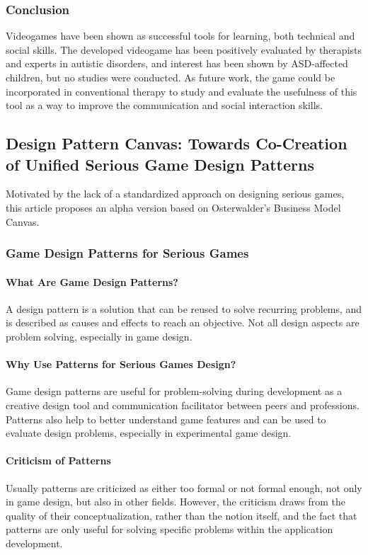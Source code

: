 \documentclass[runningheads]{llncs}
\begin{document}
\subsubsection{Conclusion}
\par Videogames have been shown as successful tools for learning, both technical and social skills. The developed videogame has been positively evaluated by therapists and experts in autistic disorders, and interest has been shown by ASD-affected children, but no studies were conducted. As future work, the game could be incorporated in conventional therapy to study and evaluate the usefulness of this tool as a way to improve the communication and social interaction skills.

\subsection{Design Pattern Canvas: Towards Co-Creation of Unified Serious Game Design Patterns} 
\par Motivated by the lack of a standardized approach on designing serious games, this article proposes an alpha version based on Osterwalder's Business Model Canvas.
\subsubsection{Game Design Patterns for Serious Games}
\paragraph{What Are Game Design Patterns?} A design pattern is a solution that can be reused to solve recurring problems, and is described as causes and effects to reach an objective. Not all design aspects are problem solving, especially in game design.
\paragraph{Why Use Patterns for Serious Games Design?} Game design patterns are useful for problem-solving during development as a creative design tool and communication facilitator between peers and professions. Patterns also help to better understand game features and can be used to evaluate design problems, especially in experimental game design.
\paragraph{Criticism of Patterns} Usually patterns are criticized as either too formal or not formal enough, not only in game design, but also in other fields. However, the criticism draws from the quality of their conceptualization, rather than the notion itself, and the fact that patterns are only useful for solving specific problems within the application development.
\end{document}
